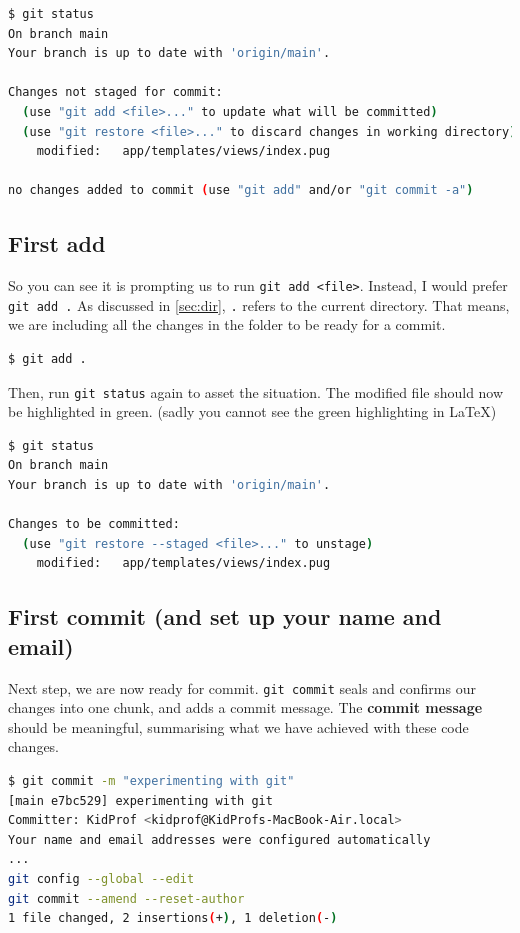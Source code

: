 \begin{lstlisting}[language=bash]
$ git status
On branch main
Your branch is up to date with 'origin/main'.

Changes not staged for commit:
  (use "git add <file>..." to update what will be committed)
  (use "git restore <file>..." to discard changes in working directory)
	modified:   app/templates/views/index.pug

no changes added to commit (use "git add" and/or "git commit -a")
\end{lstlisting}

\subsection*{First add}
So you can see it is prompting us to run \texttt{git add <file>}. Instead, I would prefer \texttt{git add .} As discussed in \cref{sec:dir}, \texttt{.} refers to the current directory. That means, we are including all the changes in the folder to be ready for a commit.

\begin{lstlisting}[language=bash]
$ git add .
\end{lstlisting}

Then, run \texttt{git status} again to asset the situation. The modified file should now be highlighted in green. (sadly you cannot see the green highlighting in \LaTeX)

\begin{lstlisting}[language=bash]
$ git status
On branch main
Your branch is up to date with 'origin/main'.

Changes to be committed:
  (use "git restore --staged <file>..." to unstage)
	modified:   app/templates/views/index.pug
\end{lstlisting}

\subsection*{First commit (and set up your name and email)}

Next step, we are now ready for commit. \texttt{git commit} seals and confirms our changes into one chunk, and adds a commit message. The \textbf{commit message} should be meaningful, summarising what we have achieved with these code changes.

\begin{lstlisting}[language=bash]
$ git commit -m "experimenting with git"
[main e7bc529] experimenting with git
Committer: KidProf <kidprof@KidProfs-MacBook-Air.local>
Your name and email addresses were configured automatically
...
git config --global --edit
git commit --amend --reset-author
1 file changed, 2 insertions(+), 1 deletion(-)
\end{lstlisting}

